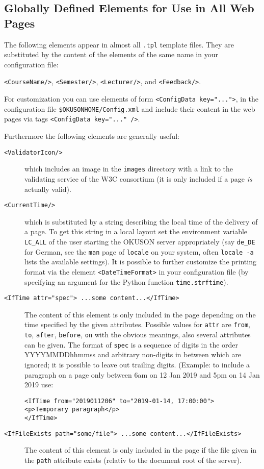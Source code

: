 \documentclass[12pt,openany,a4paper]{book}
\newcommand{\OKUSON}{\textsf{OKUSON}}
\begin{document}
\subsection{Globally Defined Elements for Use in All Web Pages}

The following elements appear in almost all \texttt{.tpl} template files. 
They are substituted 
by the content of the elements of the same name in your configuration file:

\texttt{<CourseName/>}, \texttt{<Semester/>}, \texttt{<Lecturer/>},
and \texttt{<Feedback/>}.

For customization you can use elements of form \texttt{<ConfigData key="...">},
in the configuration file \texttt{\$OKUSONHOME/Config.xml} 
and include their content in the web pages via tags 
\texttt{<ConfigData key="..." />}. 

Furthermore the following elements are generally useful:
\begin{description}
\item[\texttt{<ValidatorIcon/>}] which includes an image in
the \texttt{images} directory with a link to the validating service of the
W3C consortium (it is only included if a page \emph{is} actually valid).
\item[\texttt{<CurrentTime/>}] which is substituted by a string describing
the local time of the delivery of a page. To get this string in a local
layout set the environment variable \verb+LC_ALL+ of the user starting the
{\OKUSON} server appropriately (say \verb+de_DE+ for German, see the
\texttt{man} page of \texttt{locale} on your system, often \texttt{locale
-a} lists the available settings). It is possible to further customize the 
printing format via the element \texttt{<DateTimeFormat>} in your
configuration file (by specifying an argument for the Python function
\texttt{time.strftime}).

\item[\texttt{<IfTime attr="spec"> ...some content...</IfTime>}]
The content of this element is only 
included in the page depending on the time specified by the given attributes. 
Possible values for \texttt{attr} are \texttt{from}, \texttt{to},
\texttt{after}, \texttt{before}, \texttt{on} with the obvious meanings, also
several attributes can be given. 
The format of \texttt{spec} is
a sequence of digits in the order YYYYMMDDhhmmss and arbitrary non-digits in
between which are ignored; it is possible to leave out trailing digits. 
(Example: to include a paragraph on a page only between 6am on 12 Jan 2019 and
5pm on 14 Jan 2019 use:
\begin{verbatim}
<IfTime from="2019011206" to="2019-01-14, 17:00:00">
<p>Temporary paragraph</p>
</IfTime>
\end{verbatim}

\item[\texttt{<IfFileExists path="some/file"> ...some
content...</IfFileExists>}]
The content of this element is only 
included in the page if the file given in the \texttt{path} attribute exists (relativ to the document root of the server).
\end{description}
\end{document}
